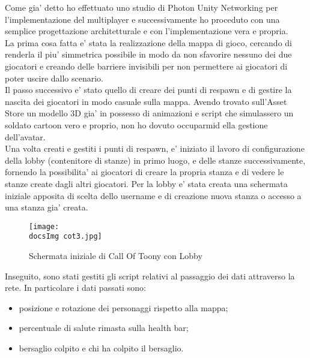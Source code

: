 Come gia' detto ho effettuato uno studio di Photon Unity Networking per l'implementazione del multiplayer e successivamente ho proceduto con una semplice progettazione architetturale e con l'implementazione vera e propria.\\

La prima cosa fatta e' stata la realizzazione della mappa di gioco, cercando di renderla il piu' simmetrica possibile in modo da non sfavorire nessuno dei due giocatori e creando delle barriere invisibili per non permettere ai giocatori di poter uscire dallo scenario.\\
Il passo successivo e' stato quello di creare dei punti di respawn e di gestire la nascita dei giocatori in modo casuale sulla mappa. Avendo trovato sull'Asset Store un modello 3D gia' in possesso di animazioni e script che simulassero un soldato cartoon vero e proprio, non ho dovuto occuparmid ella gestione dell'avatar.\\
Una volta creati e gestiti i punti di respawn, e' iniziato il lavoro di configurazione della lobby (contenitore di stanze) in primo luogo, e delle stanze successivamente, fornendo la possibilita' ai giocatori di creare la propria stanza e di vedere le stanze create dagli altri giocatori. Per la lobby e' stata creata una schermata iniziale apposita di scelta dello username e di creazione nuova stanza o accesso a una stanza gia' creata.

\begin{figure}[H]
	\centering
	\texttt{[image: \\docsImg cot3.jpg]}
	\caption{Schermata iniziale di Call Of Toony con Lobby}
	\label{fig:Schermata iniziale di Call Of Toony con Lobby}
\end{figure}

Inseguito, sono stati gestiti gli script relativi al passaggio dei dati attraverso la rete. In particolare i dati passati sono:

\begin{itemize}
	\item posizione e rotazione dei personaggi rispetto alla mappa;
	\item percentuale di salute rimasta sulla health bar;
	\item bersaglio colpito e chi ha colpito il bersaglio.
\end{itemize}

